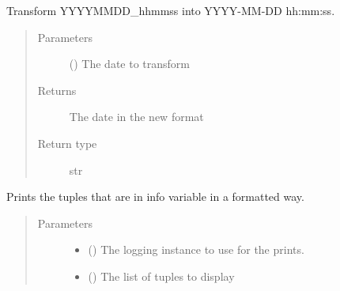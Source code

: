 \documentclass[a4paper,10pt,english]{sphinxmanual}
\begin{document}
\begin{fulllineitems}
\label{\detokenize{commands/apidoc/src:src.__init__.only_numbers}}
\end{fulllineitems}


\begin{fulllineitems}
\label{\detokenize{commands/apidoc/src:src.__init__.parse_date}}
Transform YYYYMMDD\_hhmmss into YYYY-MM-DD hh:mm:ss.
\begin{quote}\begin{description}
\item[{Parameters}] \leavevmode
{} () \textendash{} The date to transform

\item[{Returns}] \leavevmode
The date in the new format

\item[{Return type}] \leavevmode
str

\end{description}\end{quote}

\end{fulllineitems}


\begin{fulllineitems}
\label{\detokenize{commands/apidoc/src:src.__init__.print_info}}
Prints the tuples that are in info variable in a formatted way.
\begin{quote}\begin{description}
\item[{Parameters}] \leavevmode\begin{itemize}
\item {} 
 () \textendash{} The logging instance to use for the prints.

\item {} 
 () \textendash{} The list of tuples to display

\end{itemize}

\end{description}\end{quote}

\end{fulllineitems}
\end{document}
